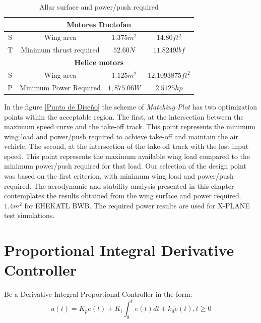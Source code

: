 \begin{table}[!h]
    \label{superficie alar y potencia/empuje requeridos para EHEKATL BWB}
    \caption{Allar surface and power/push required}
    \centering
    \begin{tabular}{|c|c|c|c|}
    \hline
    \multicolumn{4}{|c|}{\textbf{Motores Ductofan}} \\
    \hline
      S   &  Wing area & $1.375 m^2$ & $14.80 ft^2$ \\
     T    & Minimum thrust required & $52.60N$ & $11.8249 lbf$ \\
     \hline
     \multicolumn{4}{|c|}{\textbf{Helice motors}} \\
     \hline
     S   &  Wing area & $1.125 m^2$ & $12.1093875 ft^2$ \\
     P   & Minimum Power Required & $1,875.06 W$ & $2.5125 hp$ \\
     \hline
    \end{tabular}
\end{table}

In the figure \ref{Punto de Diseño} the scheme of \textit{Matching Plot} has two optimization points within the acceptable region.
%
The first, at the intersection between the maximum speed curve and the take-off track. This point represents the minimum wing load and power/push required to achieve take-off and maintain the air vehicle. 
%
The second, at the intersection of the take-off track with the lost input speed. This point represents the maximum available wing load compared to the minimum power/push required for that load.
%
Our selection of the design point was based on the first criterion, with minimum wing load and power/push required. 
%
The aerodynamic and stability analysis presented in this chapter contemplates the results obtained from the wing surface and power required. $1.4m^2$ for EHEKATL BWB. 
%
The required power results are used for X-PLANE test simulations. 


\section{Proportional Integral Derivative Controller}

Be a Derivative Integral Proportional Controller in the form:
\begin{equation}
    u(t) = K_p e(t) + K_i \int_0^t e(t) dt + k_d \dot e(t), t \geq 0 
\end{equation}  


